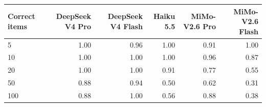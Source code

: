 \begin{tabular}{lrrrrr}
\toprule
Correct items & DeepSeek V4 Pro & DeepSeek V4 Flash & Haiku 5.5 & MiMo-V2.6 Pro & MiMo-V2.6 Flash \\
\midrule
5 & 1.00 & 0.96 & 1.00 & 0.91 & 1.00 \\
10 & 1.00 & 1.00 & 1.00 & 0.96 & 0.87 \\
20 & 1.00 & 1.00 & 0.91 & 0.77 & 0.55 \\
50 & 0.88 & 0.94 & 0.50 & 0.62 & 0.31 \\
100 & 0.88 & 1.00 & 0.56 & 0.88 & 0.38 \\
\bottomrule
\end{tabular}
